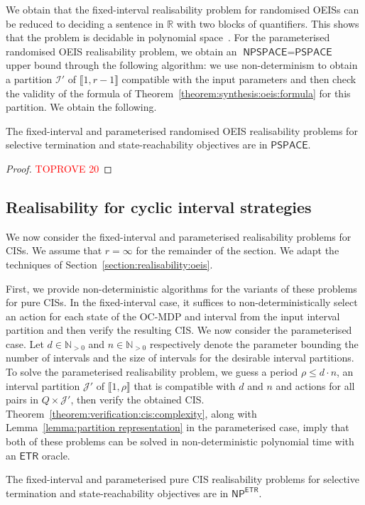 \documentclass[a4paper,UKenglish,cleveref,autoref,thm-restate,colorlinks]{lipics-v2021}
\newcommand{\integerInterval}[1]{\llbracket{}#1\rrbracket{}}
\newcommand{\pspace}{\textsf{PSPACE}}
\newcommand{\npspace}{\textsf{NPSPACE}}
\newcommand{\np}{\textsf{NP}}
\newcommand{\etr}{\textsf{ETR}}
\newcommand{\IR}{\mathbb{R}}
\newcommand{\IN}{\mathbb{N}}
\newcommand{\INpos}{\IN_{>0}}
\newcommand{\ocStateSpace}{Q}
\newcommand{\counterUB}{r}
\newcommand{\period}{\rho}
\newcommand{\intPart}{\mathcal{I}}
\newcommand{\intPartB}{\mathcal{J}}
\newcommand{\intNum}{d}
\newcommand{\intSize}{n}
\begin{document}
We obtain that the fixed-interval realisability problem for randomised OEISs can be reduced to deciding a sentence in $\IR$ with two blocks of quantifiers.
This shows that the problem is decidable in polynomial space~\cite[Rmk.~13.10]{BPR2006}.
For the parameterised randomised OEIS realisability problem, we obtain an $\npspace = \pspace$~\cite{DBLP:journals/jcss/Savitch70} upper bound through the following algorithm: we use non-determinism to obtain a partition $\intPart'$ of $\integerInterval{1, \counterUB-1}$ compatible with the input parameters and then check the validity of the formula of Theorem~\ref{theorem:synthesis:oeis:formula} for this partition.
We obtain the following.
\begin{theorem}\label{theorem:realisability:oeis:randomised}
  The fixed-interval and parameterised randomised OEIS realisability problems for selective termination and state-reachability objectives are in $\pspace$.
\end{theorem}
\begin{proof}\textcolor{red}{TOPROVE 20}\end{proof}




  




\subsection{Realisability for cyclic interval strategies}\label{section:realisability:cis}

We now consider the fixed-interval and parameterised realisability problems for CISs.
We assume that $\counterUB=\infty$ for the remainder of the section.
We adapt the techniques of Section~\ref{section:realisability:oeis}.

First, we provide non-deterministic algorithms for the variants of these problems for pure CISs.
In the fixed-interval case, it suffices to non-deterministically select an action for each state of the OC-MDP and interval from the input interval partition and then verify the resulting CIS.
We now consider the parameterised case.
Let $\intNum\in\INpos$ and $\intSize\in\INpos$ respectively denote the parameter bounding the number of intervals and the size of intervals for the desirable interval partitions.
To solve the parameterised realisability problem, we guess a period $\period\leq\intNum\cdot\intSize$, an interval partition $\intPartB'$ of $\integerInterval{1, \period}$ that is compatible with $\intNum$ and $\intSize$ and actions for all pairs in $\ocStateSpace\times\intPartB'$, then verify the obtained CIS.
Theorem~\ref{theorem:verification:cis:complexity}, along with Lemma~\ref{lemma:partition representation} in the parameterised case, imply that both of these problems can be solved in non-deterministic polynomial time with an $\etr$ oracle.
\begin{theorem}\label{theorem:realisability:cis:pure}
  The fixed-interval and parameterised pure CIS realisability problems for selective termination and state-reachability objectives are in $\np^\etr$.
\end{theorem}
\end{document}
